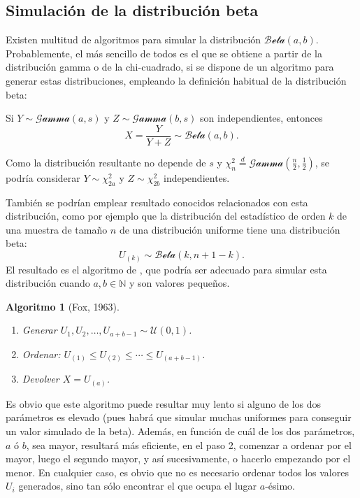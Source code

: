 \documentclass[
  spanish,
  10pt,
]{book}
\theoremstyle{break}
\newtheorem{conjecture}{Algoritmo}[chapter]
\theoremstyle{nonumberplain}
\begin{document}
\subsection{Simulación de la distribución beta}\label{simulaciuxf3n-de-la-distribuciuxf3n-beta}

Existen multitud de algoritmos para simular la distribución \(\mathcal{Beta}(a, b)\).
Probablemente, el más sencillo de todos es el que se obtiene a partir de la distribución gamma o de la chi-cuadrado, si se dispone de un algoritmo para generar estas distribuciones, empleando la definición habitual de la distribución beta:

Si \(Y \sim \mathcal{Gamma}(a, s)\) y \(Z \sim  \mathcal{Gamma}(b, s)\) son independientes, entonces \[X=\frac{Y}{Y+Z} \sim \mathcal{Beta}(a, b).\]

Como la distribución resultante no depende de \(s\) y \(\chi^2_{n} \overset{d}{=} \mathcal{Gamma}\left(\tfrac{n}{2}, \tfrac{1}{2}\right)\), se podría considerar \(Y \sim \chi^2_{2a}\) y \(Z \sim \chi^2_{2b}\) independientes.

También se podrían emplear resultado conocidos relacionados con esta distribución, como por ejemplo que la distribución del estadístico de orden \(k\) de una muestra de tamaño \(n\) de una distribución uniforme tiene una distribución beta:
\[U_{(k)} \sim \mathcal{Beta}(k,n+1-k).\]
El resultado es el algoritmo de \citet{fox1963}, que podría ser adecuado para simular esta distribución cuando \(a, b \in \mathbb{N}\) y son valores pequeños.

\begin{conjecture}[Fox, 1963]
\protect\hypertarget{cnj:fox}{}\label{cnj:fox}

\begin{enumerate}
\def\labelenumi{\arabic{enumi}.}
\item
  Generar \(U_1, U_2, \ldots, U_{a+b-1} \sim \mathcal{U}(0, 1)\).
\item
  Ordenar: \(U_{(1)}\leq U_{(2)}\leq\cdots\leq U_{(a+b-1)}\).
\item
  Devolver \(X=U_{(a)}\).
\end{enumerate}

\end{conjecture}

Es obvio que este algoritmo puede resultar muy lento si alguno de los dos parámetros es elevado (pues habrá que simular muchas uniformes para conseguir un valor simulado de la beta).
Además, en función de cuál de los dos parámetros, \(a\) ó \(b\), sea mayor, resultará más eficiente, en el paso 2, comenzar a ordenar por el mayor, luego el segundo mayor, y así sucesivamente, o hacerlo empezando por el menor.
En cualquier caso, es obvio que no es necesario ordenar todos los valores \(U_{i}\) generados, sino tan sólo encontrar el que ocupa el lugar \(a\)-ésimo.
\end{document}
